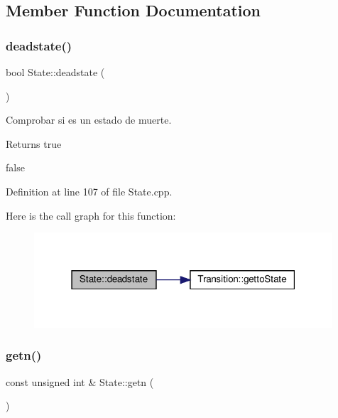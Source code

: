 \subsection{Member Function Documentation}
\mbox{\label{class_state_ab13a676e36927c127c62dba45ad7b635}} 
\subsubsection{\texorpdfstring{deadstate()}{deadstate()}}
{\footnotesize\ttfamily bool State\+::deadstate (\begin{DoxyParamCaption}{ }\end{DoxyParamCaption})}



Comprobar si es un estado de muerte. 

\begin{DoxyReturn}{Returns}
true 

false 
\end{DoxyReturn}


Definition at line 107 of file State.\+cpp.

Here is the call graph for this function\+:
\nopagebreak
\begin{figure}[H]
\begin{center}
\leavevmode
\includegraphics[width=315pt]{class_state_ab13a676e36927c127c62dba45ad7b635_cgraph}
\end{center}
\end{figure}
\mbox{\label{class_state_ac045d201c81b6ea1ff3da734c6e286a7}} 
\subsubsection{\texorpdfstring{getn()}{getn()}}
{\footnotesize\ttfamily const unsigned int \& State\+::getn (\begin{DoxyParamCaption}{ }\end{DoxyParamCaption})}



